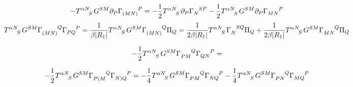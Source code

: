 \documentclass{article}
\begin{document}
\begin{align*}
    -\tensor{T}{^\alpha^N_{S}}G^{SM}\pd_P\tensor{\Gamma}{_{(MN)}^P}=-\frac{1}{2}\tensor{T}{^\alpha^N_{S}}\pd_P\tensor{\Gamma}{_N^S^P}-\frac{1}{2}\tensor{T}{^\alpha^N_{S}}G^{SM}\pd_P\tensor{\Gamma}{_{MN}^P}
\end{align*}
\begin{align*}
    \tensor{T}{^\alpha^N_{S}}G^{SM}\tensor{\Gamma}{_{(MN)}^Q}\tensor{\Gamma}{_P_Q^P} = \frac{1}{\beta|R_1|}\tensor{T}{^\alpha^N_{S}}G^{SM}\tensor{\Gamma}{_{(MN)}^Q}\Pi_Q = \frac{1}{2\beta|R_1|}\tensor{T}{^\alpha^N_S}\tensor{\Gamma}{_N^S^Q}\Pi_Q+\frac{1}{2\beta|R_1|}\tensor{T}{^\alpha^N_S}G^{SM}\tensor{\Gamma}{_M_N^Q}\Pi_Q
\end{align*}

\begin{align*}
    -\frac{1}{2}\tensor{T}{^\alpha^N_S}G^{SM}\tensor{\Gamma}{_P_M^Q}\tensor{\Gamma}{_Q_N^P}= 
\end{align*}

\begin{align*}
    -\frac{1}{2}\tensor{T}{^\alpha^N_S}G^{SM}\tensor{\Gamma}{_{P(M}^Q}\tensor{\Gamma}{_{N)Q}^P} = -\frac{1}{4}\tensor{T}{^\alpha^N_S}G^{SM}\tensor{\Gamma}{_{PM}^Q}\tensor{\Gamma}{_{NQ}^P}-\frac{1}{4}\tensor{T}{^\alpha^N_S}G^{SM}\tensor{\Gamma}{_{PN}^Q}\tensor{\Gamma}{_{MQ}^P}
\end{align*}
\end{document}
